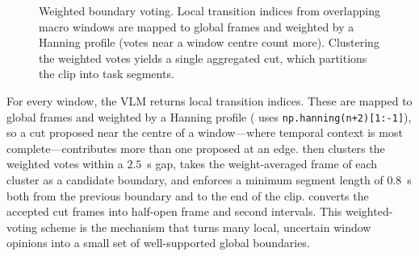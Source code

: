 \documentclass[11pt,oneside]{report}
\begin{document}
\begin{figure}[htbp]
\centering
{}
\caption[Weighted boundary voting]{Weighted boundary voting. Local transition indices from overlapping
macro windows are mapped to global frames and weighted by a Hanning profile
(votes near a window centre count more). Clustering the weighted votes yields a
single aggregated cut, which partitions the clip into task segments.}
\label{fig:boundary-voting}
\end{figure}

For every window, the VLM returns local transition indices. These are mapped to
global frames and weighted by a Hanning profile
( uses \texttt{np.hanning(n+2)[1:-1]}), so a cut
proposed near the centre of a window---where temporal context is most
complete---contributes more than one proposed at an edge.
 then clusters the weighted votes within a
$2.5$~s gap, takes the weight-averaged frame of each cluster as a candidate
boundary, and enforces a minimum segment length of $0.8$~s both from the
previous boundary and to the end of the clip. 
converts the accepted cut frames into half-open frame and second intervals. This
weighted-voting scheme is the mechanism that turns many local, uncertain window
opinions into a small set of well-supported global boundaries.
\end{document}
